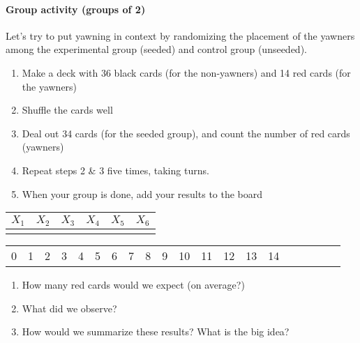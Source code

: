 \documentclass[10pt]{article}
\newcommand{\ans}{\vspace{0.25in}}
\begin{document}
\paragraph{Group activity (groups of 2)} Let's try to put yawning in context by randomizing the placement of the yawners among the experimental group (seeded) and control group (unseeded). 
\begin{enumerate}
  \itemsep0cm
  \item Make a deck with 36 black cards (for the non-yawners) and 14 red cards (for the yawners)
  \item Shuffle the cards well
  \item Deal out 34 cards (for the seeded group), and count the number of red cards (yawners)
  \item Repeat steps 2 \& 3 five times, taking turns.
  \item When your group is done, add your results to the board
\end{enumerate}

\begin{center}
\begin{tabular}{|c|c|c|c|c|c|}
  \hline
  $X_1$ & $X_2$ & $X_3$ & $X_4$ & $X_5$ & $X_6$ \\
  \hline
  \hspace{0.75in} & \hspace{0.75in} & \hspace{0.75in} & \hspace{0.75in} & \hspace{0.75in} & \hspace{0.75in} \\[5ex]
  \hline
\end{tabular}
\end{center}

\vspace{2.5in}

\begin{center}
\begin{tabular}{|c|c|c|c|c|c|c|c|c|c|c|c|c|c|c|c|c|c|c|c|}
  \hline
  0 & 1 & 2 & 3 & 4 & 5 & 6 & 7 & 8 & 9 & 10 & 11 & 12 & 13 & 14 \\
\end{tabular}
\end{center}
% 
\begin{enumerate}
  \itemsep1cm
  \item How many red cards would we expect (on average?)
  \item What did we observe?
  \item How would we summarize these results?   What is the big idea?
  \ans
\end{enumerate}
\end{document}
